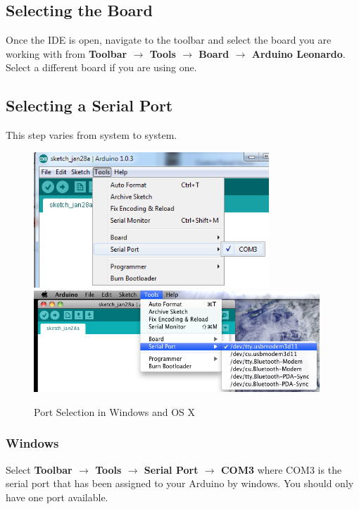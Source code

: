 \documentclass[11pt,a4paper]{article}
\begin{document}

\subsection{Selecting the Board} %
\label{sub:selecting_the_board}
Once the IDE is open, navigate to the toolbar and select the board you are working with from \textbf{Toolbar $\rightarrow$ Tools $\rightarrow$ Board $\rightarrow$ Arduino Leonardo}.  Select a different board if you are using one.


\subsection{Selecting a Serial Port} %

\label{sub:selecting_a_serial_port}
This step varies from system to system.
    \begin{figure}[htbp]
        \centering
            \includegraphics[height=2in]{figures/port-windows.png}
            \includegraphics[height=1.5in]{figures/port-osx.png}
        \caption{Port Selection in Windows and OS X}
        \label{fig:figures_port}
    \end{figure}

\subsubsection{Windows} %

\label{ssub:windows}
Select \textbf{Toolbar $\rightarrow$ Tools $\rightarrow$ Serial Port $\rightarrow$ COM3} where COM3 is the serial port that has been assigned to your Arduino by windows.  You should only have one port available.
\end{document}
